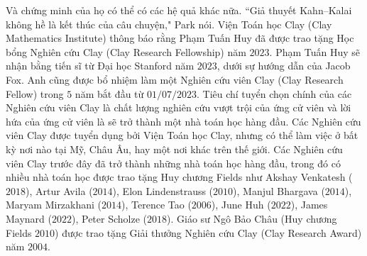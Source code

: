 \begin{multicols}{2}
	\vskip 0.1cm
	Và chứng minh của họ có thể có các hệ quả khác nữa. ``Giả thuyết Kahn--Kalai không hề là kết thúc của câu chuyện," Park nói.
	\vskip 0.1cm
	Viện Toán học Clay (Clay Mathematics Institute) thông báo rằng Phạm Tuấn Huy đã được trao tặng Học bổng Nghiên cứu Clay (Clay Research Fellowship) năm $2023$. Phạm Tuấn Huy sẽ nhận bằng tiến sĩ từ Đại học Stanford năm $2023$, dưới sự hướng dẫn của Jacob Fox. Anh cũng được bổ nhiệm làm một Nghiên cứu viên Clay (Clay Research Fellow) trong $5$ năm bắt đầu từ $01/07/2023$.
	\vskip 0.1cm
	Tiêu chí tuyển chọn chính của các Nghiên cứu viên Clay là chất lượng nghiên cứu vượt trội của ứng cử viên và lời hứa của ứng cử viên là sẽ trở thành một nhà toán học hàng đầu. Các Nghiên cứu viên Clay được tuyển dụng bởi Viện Toán học Clay, nhưng có thể làm việc ở bất kỳ nơi nào tại Mỹ, Châu Âu, hay một nơi khác trên thế giới.
	\vskip 0.1cm
	Các Nghiên cứu viên Clay trước đây đã trở thành những nhà toán học hàng đầu, trong đó có nhiều nhà toán học được trao tặng Huy chương Fields như Akshay Venkatesh ($2018$), Artur Avila ($2014$), Elon Lindenstrauss ($2010$), Manjul Bhargava ($2014$), Maryam Mirzakhani ($2014$), Terence Tao ($2006$), June Huh ($2022$), James Maynard ($2022$), Peter Scholze ($2018$). Giáo sư Ngô Bảo Châu (Huy chương Fields $2010$) được trao tặng Giải thưởng Nghiên cứu Clay (Clay Research Award) năm $2004$.
\end{multicols}